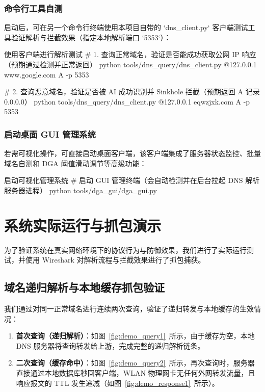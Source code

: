 \documentclass[11pt,a4paper]{ctexart}
\begin{document}
\subsubsection{命令行工具自测}
启动后，可在另一个命令行终端使用本项目自带的 `dns\_client.py` 客户端测试工具验证解析与拦截效果（指定本地解析端口 `5353`）：
\begin{codecard}{使用客户端进行解析测试}
# 1. 查询正常域名，验证是否能成功获取公网 IP 响应（预期通过检测并正常返回）
python tools/dns_query/dns_client.py @127.0.0.1 www.google.com A -p 5353

# 2. 查询恶意域名，验证是否被 AI 成功识别并 Sinkhole 拦截（预期返回 A 记录 0.0.0.0）
python tools/dns_query/dns_client.py @127.0.0.1 eqwzjxk.com A -p 5353
\end{codecard}

\subsubsection{启动桌面 GUI 管理系统}
若需可视化操作，可直接启动桌面客户端，该客户端集成了服务器状态监控、批量域名自测和 DGA 阈值滑动调节等高级功能：
\begin{codecard}{启动可视化管理系统}
# 启动 GUI 管理终端（会自动检测并在后台拉起 DNS 解析服务器进程）
python tools/dga_gui/dga_gui.py
\end{codecard}

\newpage

\section{系统实际运行与抓包演示}
为了验证系统在真实网络环境下的协议行为与防御效果，我们进行了实际运行测试，并使用 Wireshark 对解析流程与拦截效果进行了抓包捕获。

\subsection{域名递归解析与本地缓存抓包验证}
我们通过对同一正常域名进行连续两次查询，验证了递归转发与本地缓存的生效情况：
\begin{enumerate}
    \item \textbf{首次查询（递归解析）}：如图~\ref{fig:demo_query1}~所示，由于缓存为空，本地 DNS 服务器将查询转发给上游，完成完整的递归解析链条。
    \item \textbf{二次查询（缓存命中）}：如图~\ref{fig:demo_query2}~所示，再次查询时，服务器直接通过本地数据库秒回客户端，WLAN 物理网卡无任何外网转发流量，且响应报文的 TTL 发生递减（如图~\ref{fig:demo_response1}~所示）。
\end{enumerate}
\end{document}
